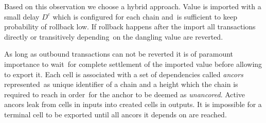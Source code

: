 Based on this observation we choose a hybrid approach.
Value is imported with a small delay $D^c$ which is configured for each chain and\
is sufficient to keep probability of rollback low.
If rollback happens after the import all transactions directly or transitively depending\
on the dangling value are reverted.

As long as outbound transactions can not be reverted it is of paramount importance to wait\
for complete settlement of the imported value before allowing to export it.
Each cell is associated with a set of dependencies called \emph{ancors} represented\
as unique identifier of a chain and a height which the chain is required to reach in order\
for the anchor to be deemed as \emph{unancored}.
Active ancors leak from cells in inputs into created cells in outputs.
It is impossible for a terminal cell to be exported until all ancors it depends on are reached.